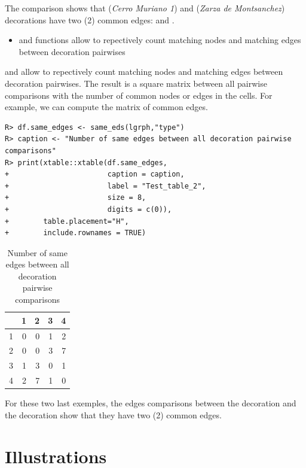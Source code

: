 \documentclass[article]{jss}\usepackage{knitr}
\begin{document}
The comparison shows that  (\emph{Cerro Muriano 1}) and  (\emph{Zarza de Montsanchez}) decorations have two (2) common edges:  and .

\begin{itemize}
\setlength\itemsep{.1em}
  \item {} and  functions allow to repectively count matching nodes and matching edges between decoration pairwises
\end{itemize}

 and  allow to repectively count matching nodes and matching edges between decoration pairwises. The result is a square matrix between all pairwise comparisons with the number of common nodes or edges in the cells. For example, we can compute the matrix of common edges.

\begin{kframe}
\begin{verbatim}
R> df.same_edges <- same_eds(lgrph,"type")
R> caption <- "Number of same edges between all decoration pairwise comparisons"
R> print(xtable::xtable(df.same_edges,
+                       caption = caption,
+                       label = "Test_table_2",
+                       size = 8,
+                       digits = c(0)),
+        table.placement="H",
+        include.rownames = TRUE)
\end{verbatim}
\end{kframe}%
\begin{table}[H]
\centering
\begin{tabular}{rrrrr}
  \hline
 & 1 & 2 & 3 & 4 \\ 
  \hline
1 & 0 & 0 & 1 & 2 \\ 
  2 & 0 & 0 & 3 & 7 \\ 
  3 & 1 & 3 & 0 & 1 \\ 
  4 & 2 & 7 & 1 & 0 \\ 
   \hline
\end{tabular}
\caption{Number of same edges between all decoration pairwise comparisons} 
\label{Test_table_2}
\end{table}


For these two last exemples, the edges comparisons between the decoration  and the decoration  show that they have two (2) common edges.

\section{Illustrations} \label{sec:illustrations}
\end{document}
